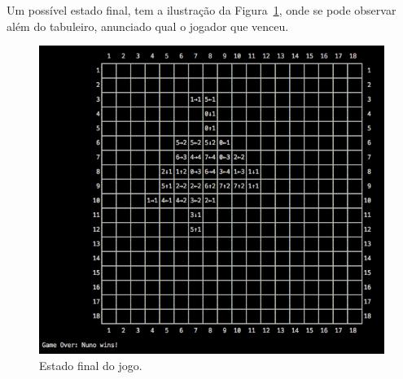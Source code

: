 \documentclass[a4paper]{article}
\begin{document}
Um possível estado final, tem a ilustração da Figura~\ref{over}, onde se pode observar além do tabuleiro, anunciado qual o jogador que venceu.

\begin{figure}[htbp]
\begin{center}
\includegraphics[scale=0.6]{final.jpg}
\caption{Estado final do jogo.}
\label{over}
\end{center}
\end{figure}

\end{document}
